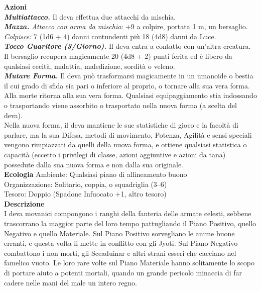 \begin{multicols}{2}
\smallskip\textbf{Azioni}\\
\emph{\textbf{Multiattacco.}} Il deva effettua due attacchi da mischia.\\
\emph{\textbf{Mazza.} Attacco con arma da mischia}: +9 a colpire, portata 1 m, un bersaglio.\\ 
\emph{Colpisce:} 7 (1d6 + 4) danni contundenti più 18 (4d8) danni da Luce.\\
\emph{\textbf{Tocco Guaritore (3/Giorno).}} Il deva entra a contatto con un'altra creatura. Il bersaglio recupera magicamente 20 (4d8 + 2) punti ferita ed è libero da qualsiasi cecità, malattia, maledizione, sordità o veleno.\\
\emph{\textbf{Mutare Forma.}} Il deva può trasformarsi magicamente in un umanoide o bestia il cui grado di sfida sia pari o inferiore al proprio, o tornare alla sua vera forma. Alla morte ritorna alla sua vera forma. Qualsiasi equipaggiamento stia indossando o trasportando viene assorbito o trasportato nella nuova forma (a scelta del deva).\\
Nella nuova forma, il deva mantiene le sue statistiche di gioco e la facoltà di parlare, ma la sua Difesa, metodi di movimento, Potenza, Agilità e sensi speciali vengono rimpiazzati da quelli della nuova forma, e ottiene qualsiasi statistica o capacità (eccetto i privilegi di classe, azioni aggiuntive e azioni da tana) possedute dalla sua nuova forma e non dalla sua originale.\\
\textbf{Ecologia}
Ambiente: Qualsiasi piano di allineamento buono\\
Organizzazione: Solitario, coppia, o squadriglia (3–6)\\
Tesoro: Doppio (Spadone Infuocato +1, altro tesoro)\\
\textbf{Descrizione}\\
I deva movanici compongono i ranghi della fanteria delle armate celesti, sebbene trascorrano la maggior parte del loro tempo pattugliando il Piano Positivo, quello Negativo e quello Materiale. Sul Piano Positivo sorvegliano le anime buone erranti, e questa volta li mette in conflitto con gli Jyoti. Sul Piano Negativo combattono i non morti, gli Sceaduinar e altri strani esseri che cacciano nel famelico vuoto. Le loro rare volte sul Piano Materiale hanno solitamente lo scopo di portare aiuto a potenti mortali, quando un grande pericolo minaccia di far cadere nelle mani del male un intero regno.\\


\end{multicols}
